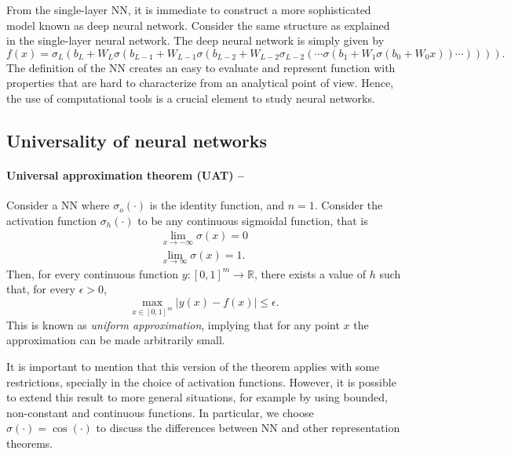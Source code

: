 \documentclass[]{report}
\begin{document}
From the single-layer NN, it is immediate to construct a more sophisticated model known as deep neural network. Consider the same structure as explained in the single-layer neural network. The deep neural network is simply given by
\begin{equation}
f(x) = \sigma_L(b_L + W_L \sigma(b_{L-1} + W_{L - 1} \sigma(b_{L-2} + W_{L - 2} \sigma_{L - 2}(\cdots\sigma(b_1 + W_1 \sigma(b_0 + W_0 x)) \cdots)))).
\end{equation}
The definition of the NN creates an easy to evaluate and represent function with properties that are hard to characterize from an analytical point of view. Hence, the use of computational tools is a crucial element to study neural networks. 

\subsection{Universality of neural networks}\label{sec.universality-nn}

\paragraph{Universal approximation theorem (UAT) \cite{cybenko1989approximation} --}Consider a NN where $\sigma_o(\cdot)$ is the identity function, and $n = 1$. Consider the activation function $\sigma_h(\cdot)$ to be any continuous sigmoidal function, that is 
\begin{align}
\lim_{x \rightarrow -\infty} \sigma(x) = 0 \\
\lim_{x \rightarrow \infty} \sigma(x) = 1.
\end{align}
Then, for every continuous function $
y:[0, 1]^m \rightarrow \mathbb R$, there exists a value of $h$ such that, for every $\epsilon > 0$, 
\begin{equation}
\max_{x \in [0, 1]^m} \left\vert y(x) - f(x)\right\vert \leq \epsilon.
\end{equation}
This is known as \textit{uniform approximation}, implying that for any point $x$ the approximation can be made arbitrarily small. 

It is important to mention that this version of the theorem applies with some restrictions, specially in the choice of activation functions. However, it is possible to extend this result to more general situations, for example by using bounded, non-constant and continuous functions. In particular, we choose $\sigma(\cdot) = \cos(\cdot)$ to discuss the differences between NN and other representation theorems. 
\end{document}
